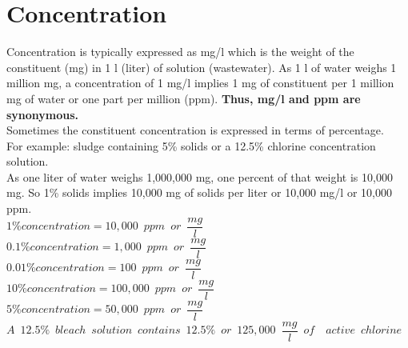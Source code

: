 \section{Concentration}

Concentration is typically expressed as mg/l which is the weight of the constituent (mg) in 1 l (liter) of solution (wastewater).  As 1 l of water weighs 1 million mg, a concentration of 1 mg/l implies 1 mg of constituent per 1 million mg of water or one part per million (ppm).   \textbf{Thus, mg/l and ppm are synonymous.}\\  
Sometimes the constituent concentration is expressed in terms of percentage.\\
\vspace{6pt}
For example:  sludge containing 5\% solids or a 12.5\% chlorine concentration solution.\\
\vspace{6pt}
As one liter of water weighs 1,000,000 mg, one percent of that weight is 10,000 mg.  So 1\% solids implies 10,000 mg of solids per liter or 10,000 mg/l or 10,000 ppm.\\
\vspace{6pt}
$1\% concentration = 10,000 \enspace ppm \enspace or \enspace\dfrac{mg}{l}$\\
\vspace{6pt}
$0.1\% concentration = 1,000 \enspace ppm \enspace or \enspace \dfrac{mg}{l}$\\
\vspace{6pt}
$0.01\% concentration = 100 \enspace ppm \enspace or \enspace \dfrac{mg}{l}$\\
\vspace{6pt}
$10\% concentration = 100,000 \enspace ppm \enspace or \enspace \dfrac{mg}{l}$\\
\vspace{6pt}
$5\% concentration = 50,000 \enspace ppm \enspace or \enspace \dfrac{mg}{l}$\\
\vspace{6pt}
$A \enspace  12.5\% \enspace bleach \enspace solution \enspace contains \enspace 12.5\% \enspace or \enspace 125,000 \enspace \dfrac{mg}{l} \enspace of \enspace \enspace active \enspace chlorine $

